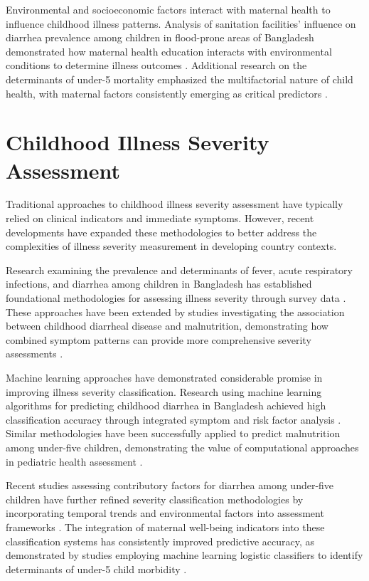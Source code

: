 \documentclass[12pt]{report}
\begin{document}
Environmental and socioeconomic factors interact with maternal health to influence childhood illness patterns. Analysis of sanitation facilities' influence on diarrhea prevalence among children in flood-prone areas of Bangladesh demonstrated how maternal health education interacts with environmental conditions to determine illness outcomes \cite{ref13}. Additional research on the determinants of under-5 mortality emphasized the multifactorial nature of child health, with maternal factors consistently emerging as critical predictors \cite{ref14}.

\section{Childhood Illness Severity Assessment}

Traditional approaches to childhood illness severity assessment have typically relied on clinical indicators and immediate symptoms. However, recent developments have expanded these methodologies to better address the complexities of illness severity measurement in developing country contexts.

Research examining the prevalence and determinants of fever, acute respiratory infections, and diarrhea among children in Bangladesh has established foundational methodologies for assessing illness severity through survey data \cite{ref3}. These approaches have been extended by studies investigating the association between childhood diarrheal disease and malnutrition, demonstrating how combined symptom patterns can provide more comprehensive severity assessments \cite{ref12}.

Machine learning approaches have demonstrated considerable promise in improving illness severity classification. Research using machine learning algorithms for predicting childhood diarrhea in Bangladesh achieved high classification accuracy through integrated symptom and risk factor analysis \cite{ref1}. Similar methodologies have been successfully applied to predict malnutrition among under-five children, demonstrating the value of computational approaches in pediatric health assessment \cite{ref2}.

Recent studies assessing contributory factors for diarrhea among under-five children have further refined severity classification methodologies by incorporating temporal trends and environmental factors into assessment frameworks \cite{ref5}. The integration of maternal well-being indicators into these classification systems has consistently improved predictive accuracy, as demonstrated by studies employing machine learning logistic classifiers to identify determinants of under-5 child morbidity \cite{ref4, ref9}.
\end{document}
